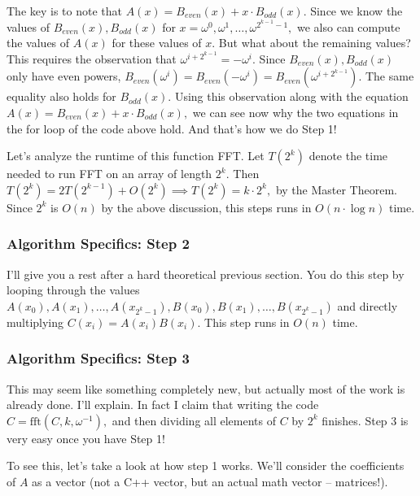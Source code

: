 The key is to note that $A(x) = B_{even}(x) + x \cdot B_{odd}(x).$ Since we know the values of $B_{even}(x), B_{odd}(x)$ for $x = \omega^0, \omega^1, \dots, \omega^{2^{k-1}-1},$ we also can compute the values of $A(x)$ for these values of $x$. But what about the remaining values? This requires the observation that $\omega^{i + 2^{k-1}} = -\omega^i.$ Since $B_{even}(x), B_{odd}(x)$ only have even powers, $B_{even}(\omega^i) = B_{even}(-\omega^i) = B_{even}(\omega^{i + 2^{k-1}}).$ The same equality also holds for $B_{odd}(x).$ Using this observation along with the equation $A(x) = B_{even}(x) + x \cdot B_{odd}(x),$ we can see now why the two equations in the for loop of the code above hold. And that's how we do Step 1!

Let's analyze the runtime of this function FFT. Let $T(2^k)$ denote the time needed to run FFT on an array of length $2^k.$ Then $T(2^k) = 2T(2^{k-1}) + O(2^k) \implies T(2^k) = k \cdot 2^k,$ by the Master Theorem. Since $2^k$ is $O(n)$ by the above discussion, this steps runs in $O(n \cdot \log n)$ time.

\subsubsection{Algorithm Specifics: Step 2}

I'll give you a rest after a hard theoretical previous section. You do this step by looping through the values $A(x_0), A(x_1), \dots, A(x_{2^k-1}), B(x_0), B(x_1), \dots, B(x_{2^k-1})$ and directly multiplying $C(x_i) = A(x_i)B(x_i).$ This step runs in $O(n)$ time.

\subsubsection{Algorithm Specifics: Step 3}

This may seem like something completely new, but actually most of the work is already done. I'll explain. In fact I claim that writing the code $C = \text{fft}(C, k, \omega^{-1}),$ and then dividing all elements of $C$ by $2^k$ finishes. Step 3 is very easy once you have Step 1!

To see this, let's take a look at how step 1 works. We'll consider the coefficients of $A$ as a vector (not a C++ vector, but an actual math vector -- matrices!).

